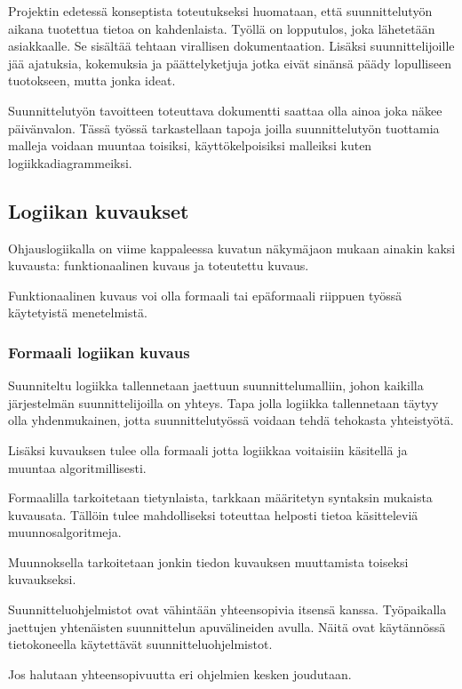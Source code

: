 \documentclass[finnish,12pt]{article}
\begin{document}
Projektin edetessä konseptista toteutukseksi huomataan, että suunnittelutyön aikana tuotettua tietoa on kahdenlaista. Työllä on lopputulos, joka lähetetään asiakkaalle. Se sisältää tehtaan virallisen dokumentaation. Lisäksi suunnittelijoille jää ajatuksia, kokemuksia ja päättelyketjuja jotka eivät sinänsä päädy lopulliseen tuotokseen, mutta jonka ideat. 

Suunnittelutyön tavoitteen toteuttava dokumentti saattaa olla ainoa joka näkee päivänvalon.
Tässä työssä tarkastellaan tapoja joilla suunnittelutyön tuottamia malleja voidaan muuntaa toisiksi, käyttökelpoisiksi malleiksi kuten logiikkadiagrammeiksi.

	\subsection{Logiikan kuvaukset}

	Ohjauslogiikalla on viime kappaleessa kuvatun näkymäjaon mukaan ainakin kaksi kuvausta: funktionaalinen kuvaus ja toteutettu kuvaus.
	
	Funktionaalinen kuvaus voi olla formaali tai epäformaali riippuen työssä käytetyistä menetelmistä. 	
	
		\subsubsection{Formaali logiikan kuvaus}
	
Suunniteltu logiikka tallennetaan jaettuun suunnittelumalliin, johon kaikilla järjestelmän suunnittelijoilla on yhteys.
Tapa jolla logiikka tallennetaan täytyy olla yhdenmukainen, jotta suunnittelutyössä voidaan tehdä tehokasta yhteistyötä.

Lisäksi kuvauksen tulee olla formaali jotta logiikkaa voitaisiin käsitellä ja muuntaa algoritmillisesti.

Formaalilla tarkoitetaan tietynlaista, tarkkaan määritetyn syntaksin mukaista kuvausata.
Tällöin tulee mahdolliseksi toteuttaa helposti tietoa käsitteleviä muunnosalgoritmeja.

Muunnoksella tarkoitetaan jonkin tiedon kuvauksen muuttamista toiseksi kuvaukseksi.

Suunnitteluohjelmistot ovat vähintään yhteensopivia itsensä kanssa.
Työpaikalla jaettujen yhtenäisten suunnittelun apuvälineiden avulla.
Näitä ovat käytännössä tietokoneella käytettävät suunnitteluohjelmistot.

Jos halutaan yhteensopivuutta eri ohjelmien kesken joudutaan.
\end{document}

